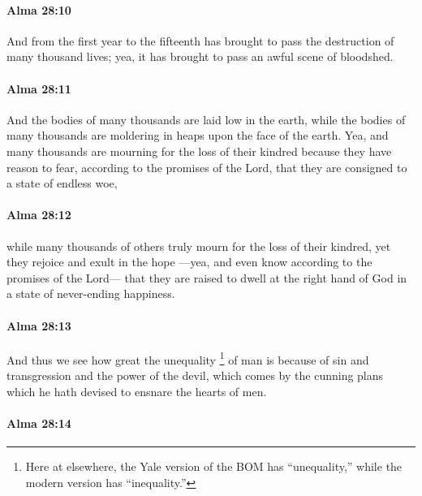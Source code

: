 		\paragraph{Alma 28:10} %
			\label{ALMA-28-10}

			And from the first year to the fifteenth has brought to pass
			the destruction of many thousand lives;
			yea, it has brought to pass an awful scene of bloodshed.

		\paragraph{Alma 28:11} %
			\label{ALMA-28-11}

			And the bodies of many thousands are laid low in the earth,
			while the bodies of many thousands are moldering
			in heaps upon the face of the earth.
			Yea, and many thousands are mourning for the loss of their kindred
			because they have reason to fear, according to the promises of the Lord,
			that they are consigned to a state of endless woe,

		\paragraph{Alma 28:12} %
			\label{ALMA-28-12}

			while many thousands of others truly mourn for the loss of their kindred,
			yet they rejoice and exult in the hope
			---yea, and even know according to the promises of the Lord---
			that they are raised to dwell at the right hand of God
			in a state of never-ending happiness.

		\paragraph{Alma 28:13} %
			\label{ALMA-28-13}
			
			And thus we see how great the unequality%
				\footnote{%
					\label{ALMA-28-13-unequality}%
					Here at elsewhere, the Yale version of the BOM has ``unequality,'' while the modern version has ``inequality.''
					}
			of man is
			because of sin and transgression and the power of the devil,
			which comes by the cunning plans which he hath devised
			to ensnare the hearts of men.

		\paragraph{Alma 28:14} %
			\label{ALMA-28-14}

